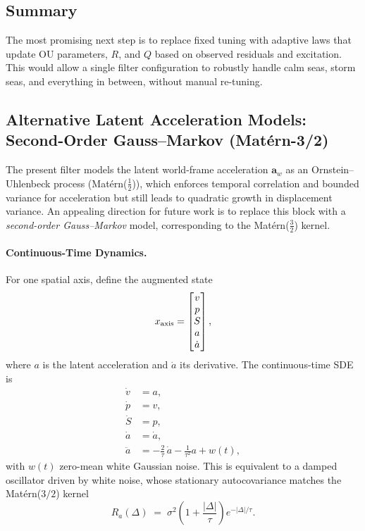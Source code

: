\documentclass[10pt]{extarticle}
\begin{document}
\subsection{Summary}
The most promising next step is to replace fixed tuning with adaptive laws that update
OU parameters, $R$, and $Q$ based on observed residuals and excitation. This would allow
a single filter configuration to robustly handle calm seas, storm seas, and everything in
between, without manual re-tuning.

\subsection{Alternative Latent Acceleration Models: Second-Order Gauss--Markov (Mat\'ern-3/2)}

The present filter models the latent world-frame acceleration $\bm a_w$ as an Ornstein--Uhlenbeck
process (Mat\'ern($\tfrac{1}{2}$)), which enforces temporal correlation and bounded variance for acceleration but
still leads to quadratic growth in displacement variance. An appealing direction for future work
is to replace this block with a \emph{second-order Gauss--Markov} model, corresponding to the
Mat\'ern($\tfrac{3}{2}$) kernel.

\paragraph{Continuous-Time Dynamics.}
For one spatial axis, define the augmented state
\[
x_{\rm axis} =
\begin{bmatrix}
v \\ p \\ S \\ a \\ \dot a
\end{bmatrix},
\]
where $a$ is the latent acceleration and $\dot a$ its derivative. The continuous-time SDE is
\begin{align}
\dot v &= a, \\
\dot p &= v, \\
\dot S &= p, \\
\dot a &= \dot a, \\
\ddot a &= -\tfrac{2}{\tau}\,\dot a - \tfrac{1}{\tau^2} a + w(t),
\end{align}
with $w(t)$ zero-mean white Gaussian noise. This is equivalent to a damped oscillator driven by
white noise, whose stationary autocovariance matches the Mat\'ern($3/2$) kernel
\[
R_a(\Delta) \;=\; \sigma^2 \left(1 + \frac{|\Delta|}{\tau}\right)e^{-|\Delta|/\tau}.
\]
\end{document}
